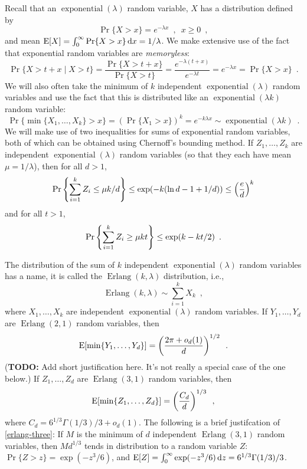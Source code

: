 \documentclass[lotsofwhite]{patmorin}
\DeclareMathOperator{\exponential}{exponential}
\DeclareMathOperator{\erlang}{Erlang}
\begin{document}
Recall that an $\exponential(\lambda)$ random variable, $X$ has a
distribution defined by
\[
   \Pr\{X>x\} = e^{-\lambda x}  \enspace , \enspace x\ge 0 \enspace ,
\]
and mean $\mathrm{E}[X] = \int_0^{\infty}
\Pr\{X>x\}\,\mathrm{d}x = 1/\lambda$.  We make extensive use of the fact
that exponential random variables are \emph{memoryless}:
\[
    \Pr\{X > t+x\mid X>t\} = \frac{\Pr\{X> t+x\}}{\Pr\{X > t\}}
           = \frac{e^{-\lambda(t+x)}}{e^{-\lambda t}} = e^{-\lambda x} = \Pr\{X > x\} \enspace .
\]
We will also often take the minimum of $k$ independent $\exponential(\lambda)$ random variables and use the fact that this is distributed like an
$\exponential(\lambda k)$ random variable:
\[
   \Pr\{\min\{X_1,\ldots,X_k\} > x\} 
      = (\Pr\{X_1 > x\})^{k}
      = e^{-k\lambda x} \sim \exponential(\lambda k) \enspace .
\]
We will make use of two inequalities for sums of exponential random
variables, both of which can be obtained using Chernoff's bounding
method.  If $Z_1,\ldots,Z_k$ are independent $\exponential(\lambda)$
random variables (so that they each have mean $\mu=1/\lambda$), then
for all $d>1$,
\begin{equation}
    \Pr\left\{\sum_{i=1}^k Z_i \le \mu k/d\right\} \le \exp(-k(\ln d -1 + 1/d)) \le \left(\frac{e}{d}\right)^k  \eqlabel{head-bound}
\end{equation}
and for all $t>1$, 
\begin{equation}
    \Pr\left\{\sum_{i=1}^k Z_i \ge \mu k t\right\} \le \exp (k-kt/2) \enspace . \eqlabel{tail-bound}
\end{equation}

The distribution of the sum of $k$ independent $\exponential(\lambda)$
random variables has a name, it is called the $\erlang(k,\lambda)$
distribution, i.e.,
\[
    \erlang(k,\lambda) \sim \sum_{i=1}^k X_k \enspace ,
\]
where $X_1,\ldots,X_k$ are independent $\exponential(\lambda)$ random variables.
If $Y_1,\ldots,Y_d$ are $\erlang(2,1)$ random variables, then
\begin{equation}
    \E[\min\{Y_1,\ldots,Y_d\}] = \left(\frac{2\pi+o_d(1)}{d}\right)^{1/2}  \enspace . \eqlabel{erlang-two}
\end{equation}
(\textbf{TODO:} Add short justification here. It's not really a special case of the one
 below.)
If $Z_1,\ldots,Z_d$ are $\erlang(3,1)$ random variables, then
\begin{equation}
    \E[\min\{Z_1,\ldots,Z_d\}] = \left(\frac{C_d}{d}\right)^{1/3}  \eqlabel{erlang-three} \enspace ,
\end{equation}
where $C_d =  6^{1/3}\Gamma (1/3) / 3 + o_d(1)$.  The following is a brief justifcation of \eqref{erlang-three}: If $M$ is the minimum of $d$ independent $\erlang(3,1)$ random 
variables, then $Md^{1/3}$ tends in distribution to a random variable 
$Z$: $\Pr\{Z>z\} = \exp(-z^3/6)$, and $\mathrm{E}[Z]= \int_0^\infty \exp(-z^3/6)\,
\mathrm{d}z = 6^{1/3}\Gamma (1/3) / 3$. 
\end{document}
